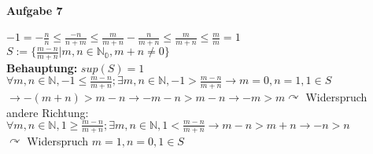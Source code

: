 \documentclass[10pt,a4paper,draft]{scrartcl}
\begin{document}
\paragraph*{Aufgabe 7}
\begin{tabbing}
$-1=-\frac{n}{n}\leq\frac{-n}{n+m}\leq\frac{m}{m+n} -\frac{n}{m+n}\leq\frac{m}{m+n}\leq\frac{m}{m} =1$\\
$S:=\{\frac{m-n}{m+n} | m,n\in\mathbb{N_{0}} ,m+n\neq 0\}$\\
\textbf{Behauptung:} $sup(S)=1$\\
$\forall m,n\in \mathbb{N}, -1\leq\frac{m-n}{m+n}; \exists m,n\in \mathbb{N}, -1>\frac{m-n}{m+n}\rightarrow m=0,n=1, 1\in S$\\$
\rightarrow -(m+n)>m-n\rightarrow -m-n>m-n\rightarrow -m>m\curvearrowright$ Widerspruch\\
andere Richtung: $\forall m,n\in\mathbb{N}, 1\geq\frac{m-n}{m+n}; \exists m,n\in \mathbb{N}, 1<\frac{m-n}{m+n}\rightarrow m-n>m+n \rightarrow -n>n$\\
$\curvearrowright$ Widerspruch $m=1, n=0, 1\in S$
\end{tabbing}
\end{document}
